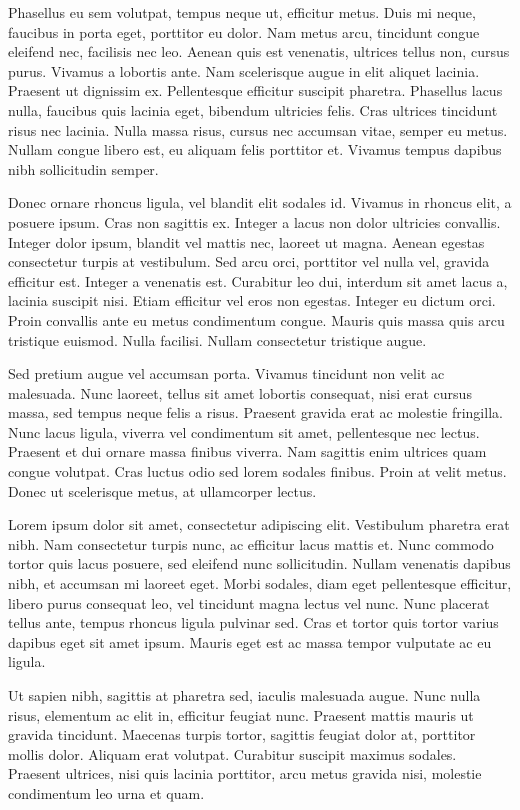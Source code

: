 \documentclass[a4paper]{memoir}
\begin{document}
Phasellus eu sem volutpat, tempus neque ut, efficitur metus. Duis mi neque, faucibus in porta eget, porttitor eu dolor. Nam metus arcu, tincidunt congue eleifend nec, facilisis nec leo. Aenean quis est venenatis, ultrices tellus non, cursus purus. Vivamus a lobortis ante. Nam scelerisque augue in elit aliquet lacinia. Praesent ut dignissim ex. Pellentesque efficitur suscipit pharetra. Phasellus lacus nulla, faucibus quis lacinia eget, bibendum ultricies felis. Cras ultrices tincidunt risus nec lacinia. Nulla massa risus, cursus nec accumsan vitae, semper eu metus. Nullam congue libero est, eu aliquam felis porttitor et. Vivamus tempus dapibus nibh sollicitudin semper. 

Donec ornare rhoncus ligula, vel blandit elit sodales id. Vivamus in rhoncus elit, a posuere ipsum. Cras non sagittis ex. Integer a lacus non dolor ultricies convallis. Integer dolor ipsum, blandit vel mattis nec, laoreet ut magna. Aenean egestas consectetur turpis at vestibulum. Sed arcu orci, porttitor vel nulla vel, gravida efficitur est. Integer a venenatis est. Curabitur leo dui, interdum sit amet lacus a, lacinia suscipit nisi. Etiam efficitur vel eros non egestas. Integer eu dictum orci. Proin convallis ante eu metus condimentum congue. Mauris quis massa quis arcu tristique euismod. Nulla facilisi. Nullam consectetur tristique augue. 

Sed pretium augue vel accumsan porta. Vivamus tincidunt non velit ac malesuada. Nunc laoreet, tellus sit amet lobortis consequat, nisi erat cursus massa, sed tempus neque felis a risus. Praesent gravida erat ac molestie fringilla. Nunc lacus ligula, viverra vel condimentum sit amet, pellentesque nec lectus. Praesent et dui ornare massa finibus viverra. Nam sagittis enim ultrices quam congue volutpat. Cras luctus odio sed lorem sodales finibus. Proin at velit metus. Donec ut scelerisque metus, at ullamcorper lectus. 

Lorem ipsum dolor sit amet, consectetur adipiscing elit. Vestibulum pharetra erat nibh. Nam consectetur turpis nunc, ac efficitur lacus mattis et. Nunc commodo tortor quis lacus posuere, sed eleifend nunc sollicitudin. Nullam venenatis dapibus nibh, et accumsan mi laoreet eget. Morbi sodales, diam eget pellentesque efficitur, libero purus consequat leo, vel tincidunt magna lectus vel nunc. Nunc placerat tellus ante, tempus rhoncus ligula pulvinar sed. Cras et tortor quis tortor varius dapibus eget sit amet ipsum. Mauris eget est ac massa tempor vulputate ac eu ligula. 

Ut sapien nibh, sagittis at pharetra sed, iaculis malesuada augue. Nunc nulla risus, elementum ac elit in, efficitur feugiat nunc. Praesent mattis mauris ut gravida tincidunt. Maecenas turpis tortor, sagittis feugiat dolor at, porttitor mollis dolor. Aliquam erat volutpat. Curabitur suscipit maximus sodales. Praesent ultrices, nisi quis lacinia porttitor, arcu metus gravida nisi, molestie condimentum leo urna et quam. 
\end{document}
